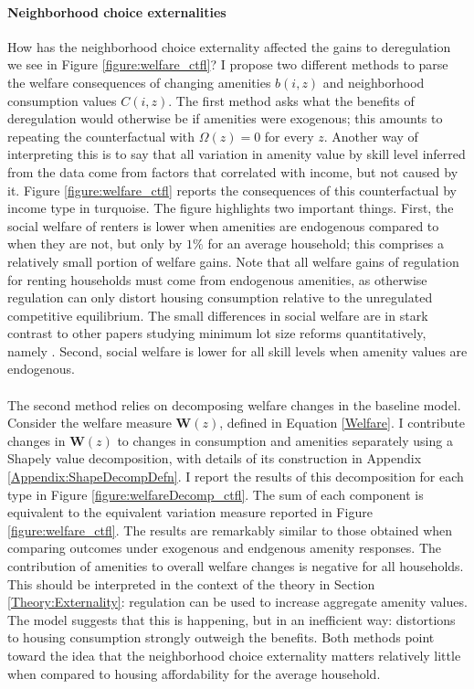 \documentclass[12pt]{article}
\begin{document}
\paragraph*{Neighborhood choice externalities} 
How has the neighborhood choice externality affected the gains to deregulation we see in Figure \ref{figure:welfare_ctfl}? I propose two different methods to parse the welfare consequences of changing amenities $b(i, z)$ and neighborhood consumption values $C(i, z)$. The first method asks what the benefits of deregulation would otherwise be if amenities were exogenous; this amounts to repeating the counterfactual with $\Omega(z) = 0$ for every $z$. Another way of interpreting this is to say that all variation in amenity value by skill level inferred from the data come from factors that correlated with income, but not caused by it. Figure \ref{figure:welfare_ctfl} reports the consequences of this counterfactual by income type in turquoise. The figure highlights two important things. First, the social welfare of renters is lower when amenities are endogenous compared to when they are not, but only by $1\%$ for an average household; this comprises a relatively small portion of welfare gains. Note that all welfare gains of regulation for renting households must come from endogenous amenities, as otherwise regulation can only distort housing consumption relative to the unregulated competitive equilibrium. The small differences in social welfare are in stark contrast to other papers studying minimum lot size reforms quantitatively, namely \cite{calabresetal}. Second, social welfare is lower for all skill levels when amenity values are endogenous.

\paragraph*{}
The second method relies on decomposing welfare changes in the baseline model. Consider the welfare measure $\boldsymbol{W}(z)$, defined in Equation \eqref{Welfare}. I contribute changes in $\boldsymbol{W}(z)$ to changes in consumption and amenities separately using a Shapely value decomposition, with details of its construction in Appendix \ref{Appendix:ShapeDecompDefn}. I report the results of this decomposition for each type in Figure \ref{figure:welfareDecomp_ctfl}. The sum of each component is equivalent to the equivalent variation measure reported in Figure \ref{figure:welfare_ctfl}. The results are remarkably similar to those obtained when comparing outcomes under exogenous and endgenous amenity responses. The contribution of amenities to overall welfare changes is negative for all households. This should be interpreted in the context of the theory in Section \ref{Theory:Externality}: regulation can be used to  increase aggregate amenity values. The model suggests that this is happening, but in an inefficient way: distortions to housing consumption strongly outweigh the benefits. Both methods point toward the idea that the neighborhood choice externality matters relatively little when compared to housing affordability for the average household.
\end{document}
